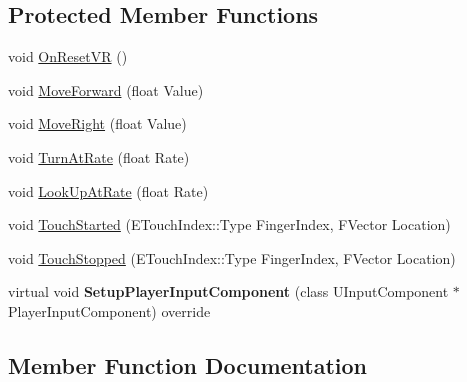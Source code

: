 \subsection*{Protected Member Functions}
\begin{DoxyCompactItemize}
\item 
void \mbox{\hyperlink{class_a_instructor_of_the_dead2_character_a0184954967f084a32645f6a922b9abf6}{On\+Reset\+VR}} ()
\item 
void \mbox{\hyperlink{class_a_instructor_of_the_dead2_character_abcb6cf374cdbe25d392fcc8f200aabc4}{Move\+Forward}} (float Value)
\item 
void \mbox{\hyperlink{class_a_instructor_of_the_dead2_character_aef03c889b18601bafcbae9ae599fafaa}{Move\+Right}} (float Value)
\item 
void \mbox{\hyperlink{class_a_instructor_of_the_dead2_character_a1aa71be0ce8a17e242cbe1f6d41bf905}{Turn\+At\+Rate}} (float Rate)
\item 
void \mbox{\hyperlink{class_a_instructor_of_the_dead2_character_a85db2f08175143a34e1d72304348a840}{Look\+Up\+At\+Rate}} (float Rate)
\item 
void \mbox{\hyperlink{class_a_instructor_of_the_dead2_character_aaf275b2c17de5ce577aa5a0e4202b222}{Touch\+Started}} (E\+Touch\+Index\+::\+Type Finger\+Index, F\+Vector Location)
\item 
void \mbox{\hyperlink{class_a_instructor_of_the_dead2_character_af518d02c1c15d184cd2e75a7aad9b6a5}{Touch\+Stopped}} (E\+Touch\+Index\+::\+Type Finger\+Index, F\+Vector Location)
\item 
\mbox{\label{class_a_instructor_of_the_dead2_character_adc1403fc3d4bc95aa169cf73bacf2d04}} 
virtual void {\bfseries Setup\+Player\+Input\+Component} (class U\+Input\+Component $\ast$Player\+Input\+Component) override
\end{DoxyCompactItemize}


\subsection{Member Function Documentation}
\mbox{\label{class_a_instructor_of_the_dead2_character_ad5bcd22697b38d057ef996ccb70dc764}} 
